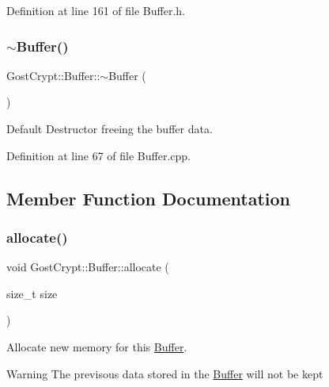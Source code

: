 Definition at line 161 of file Buffer.\+h.

\mbox{\label{class_gost_crypt_1_1_buffer_acd67d77c45dc6419bc42de6b5ed86fee}} 
\subsubsection{\texorpdfstring{$\sim$\+Buffer()}{~Buffer()}}
{\footnotesize\ttfamily Gost\+Crypt\+::\+Buffer\+::$\sim$\+Buffer (\begin{DoxyParamCaption}{ }\end{DoxyParamCaption})\hspace{0.3cm}{\ttfamily [virtual]}}



Default Destructor freeing the buffer data. 



Definition at line 67 of file Buffer.\+cpp.



\subsection{Member Function Documentation}
\mbox{\label{class_gost_crypt_1_1_buffer_ab5176ad1ed87433b479f8ccb96b84855}} 
\subsubsection{\texorpdfstring{allocate()}{allocate()}}
{\footnotesize\ttfamily void Gost\+Crypt\+::\+Buffer\+::allocate (\begin{DoxyParamCaption}\item[{size\+\_\+t}]{size }\end{DoxyParamCaption})\hspace{0.3cm}{\ttfamily [virtual]}}



Allocate new memory for this \hyperlink{class_gost_crypt_1_1_buffer}{Buffer}. 

\begin{DoxyWarning}{Warning}
The previsous data stored in the \hyperlink{class_gost_crypt_1_1_buffer}{Buffer} will not be kept 
\end{DoxyWarning}

